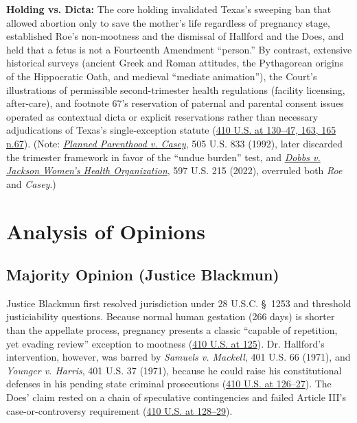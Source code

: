 \documentclass[12pt]{article}
\begin{document}
\textbf{Holding vs. Dicta:} The core holding invalidated Texas's sweeping ban that allowed abortion only to save the mother's life regardless of pregnancy stage, established Roe's non-mootness and the dismissal of Hallford and the Does, and held that a fetus is not a Fourteenth Amendment ``person.'' By contrast, extensive historical surveys (ancient Greek and Roman attitudes, the Pythagorean origins of the Hippocratic Oath, and medieval ``mediate animation''), the Court's illustrations of permissible second-trimester health regulations (facility licensing, after-care), and footnote 67's reservation of paternal and parental consent issues operated as contextual dicta or explicit reservations rather than necessary adjudications of Texas's single-exception statute (\href{https://supreme.justia.com/cases/federal/us/410/113/}{410 U.S. at 130--47, 163, 165 n.67}). (Note: \href{https://www.law.cornell.edu/gender-justice/resource/roe_v._wade}{\textit{Planned Parenthood v. Casey}}, 505 U.S. 833 (1992), later discarded the trimester framework in favor of the ``undue burden'' test, and \href{https://www.supremecourt.gov/opinions/21pdf/19-1392_6j37.pdf}{\textit{Dobbs v. Jackson Women's Health Organization}}, 597 U.S. 215 (2022), overruled both \textit{Roe} and \textit{Casey}.)

\section{Analysis of Opinions}

\subsection{Majority Opinion (Justice Blackmun)}

Justice Blackmun first resolved jurisdiction under 28 U.S.C. \S~1253 and threshold justiciability questions. Because normal human gestation (266 days) is shorter than the appellate process, pregnancy presents a classic ``capable of repetition, yet evading review'' exception to mootness (\href{https://supreme.justia.com/cases/federal/us/410/113/}{410 U.S. at 125}). Dr. Hallford's intervention, however, was barred by \textit{Samuels v. Mackell}, 401 U.S. 66 (1971), and \textit{Younger v. Harris}, 401 U.S. 37 (1971), because he could raise his constitutional defenses in his pending state criminal prosecutions (\href{https://supreme.justia.com/cases/federal/us/410/113/}{410 U.S. at 126--27}). The Does' claim rested on a chain of speculative contingencies and failed Article III's case-or-controversy requirement (\href{https://supreme.justia.com/cases/federal/us/410/113/}{410 U.S. at 128--29}).
\end{document}
